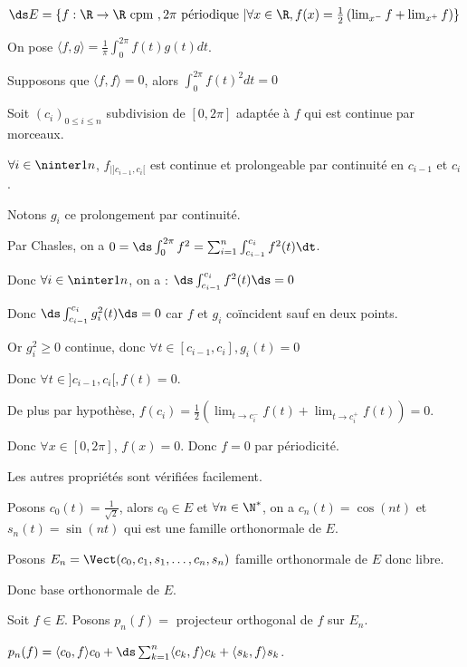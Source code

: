 \begin{exemple}
    $\ds E = \{ f : \R \to \R \text{ cpm }, 2 \pi \text{ périodique } | \forall x \in \R, f(x) = \frac 1 2 \left( \lim_{x^-} f + \lim_{x^+} f \right) \}$

    On pose $\langle f, g \rangle = \frac{1}{\pi} \int_0^{2\pi} f(t) g(t) dt$.

    Supposons que $\langle f, f \rangle = 0$, alors $\int_{0}^{2 \pi} f(t)^2 dt = 0$ 

    Soit $(c_i)_{0 \leqslant i \leqslant n}$ subdivision de $[0, 2\pi]$ adaptée à $f$ qui est continue par morceaux. 

    $\forall i \in \ninter 1 n$, $f_{|]c_{i - 1}, c_i[} $ est continue et prolongeable par continuité en 
    $c_{i - 1}$ et $c_i$.

    Notons $g_i$ ce prolongement par continuité. 

    Par Chasles, on a $0 = \ds \int_{0}^{2 \pi} f^2 = \sum_{i = 1 }^{n } \int_{c_{i - 1}}^{c_i }f^2(t) \dt$.

    Donc $\forall i \in \ninter 1 n$, on a : $\ds \int_{c_{i - 1}}^{c_i } f^2 (t) \ds = 0$

    Donc $\ds \int_{c_{i - 1}}^{c_i } g_i^2 (t) \ds = 0$ car $f$ et $g_i$ coïncident sauf en deux points. 

    Or $g_i^2 \geqslant 0$ continue, donc $\forall t \in [c_{i - 1}, c_i], g_i(t) = 0$ 

    Donc $\forall t \in ]c_{i - 1}, c_i[, f(t) = 0$.

    De plus par hypothèse, $f(c_i) = \frac 1 2 \left( \lim_{t \to c_i^-} f(t) + \lim_{t \to c_i^+} f(t) \right) = 0$.

    Donc $\forall x \in [0, 2 \pi]$, $f(x) = 0$. Donc $f = 0$ par périodicité. 

    Les autres propriétés sont vérifiées facilement.

    Posons $c_0(t) = \frac 1 {\sqrt 2}$, alors $c_0 \in E$ 
    et $\forall n \in \N^*$, on a $c_n(t) = \cos(nt)$ et $s_n(t) = \sin(nt)$ qui est une famille orthonormale de $E$.

    Posons $E_n = \Vect(c_0, c_1, s_1, \dots, c_n, s_n)$ famille orthonormale de $E$ donc libre. 

    Donc base orthonormale de $E$.

    Soit $f \in E$. Posons $p_n(f) = $ projecteur orthogonal de $f$ sur $E_n$.

    $p_n(f) = \langle c_0, f \rangle c_0 + \ds \sum_{k = 1}^n \langle c_k, f \rangle c_k + \langle s_k, f \rangle s_k$.


\end{exemple}
